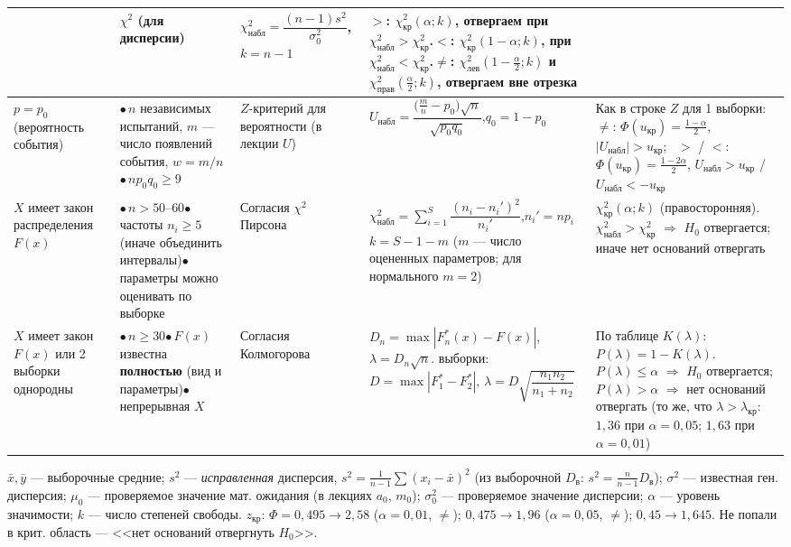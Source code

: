 \documentclass[a4paper,landscape,10pt]{extarticle}
\newcommand{\kr}{\text{кр}}\newcommand{\nab}{\text{набл}}
\newcommand{\bl}{$\bullet$\,}
\begin{document}
\begin{tabular}{|P{2.3cm}|P{4.6cm}|P{2.2cm}|P{7.1cm}|P{9.2cm}|}
& $\chi^2$ (для дисперсии)
& $\chi^2_\nab=\dfrac{(n-1)s^2}{\sigma_0^2}$,\quad $k=n-1$
& $>$: $\chi^2_\kr(\alpha;k)$, отвергаем при $\chi^2_\nab>\chi^2_\kr$.\quad $<$: $\chi^2_\kr(1-\alpha;k)$, при $\chi^2_\nab<\chi^2_\kr$.\newline $\ne$: $\chi^2_{\text{лев}}(1-\frac\alpha2;k)$ и $\chi^2_{\text{прав}}(\frac\alpha2;k)$, отвергаем \textbf{вне} отрезка \\\hline
$p=p_0$ (вероятность события)
&\newline\bl $n$ независимых испытаний, $m$ --- число появлений события, $w=m/n$\newline\bl $np_0q_0\ge9$
& $Z$-критерий для вероятности (в лекции $U$)
& $U_\nab=\dfrac{\bigl(\frac mn-p_0\bigr)\sqrt n}{\sqrt{p_0q_0}}$,\quad $q_0=1-p_0$
& Как в строке $Z$ для 1 выборки: $\ne$: $\Phi(u_\kr)=\frac{1-\alpha}{2}$, $|U_\nab|>u_\kr$; \ $>$ / $<$: $\Phi(u_\kr)=\frac{1-2\alpha}{2}$, $U_\nab>u_\kr$ / $U_\nab<-u_\kr$ \\\hline
$X$ имеет закон распределения $F(x)$
&\newline\bl $n>50$--$60$\newline\bl частоты $n_i\ge5$ (иначе объединить интервалы)\newline\bl параметры можно оценивать по выборке
& Согласия $\chi^2$ Пирсона
& $\chi^2_\nab=\sum\limits_{i=1}^{S}\dfrac{(n_i-n_i')^2}{n_i'}$,\quad $n_i'=np_i$\newline $k=S-1-m$ ($m$ --- число оцененных параметров; для нормального $m=2$)
& $\chi^2_\kr(\alpha;k)$ (правосторонняя).\newline $\chi^2_\nab>\chi^2_\kr$ $\Rightarrow$ $H_0$ отвергается; иначе нет оснований отвергать \\\hline
$X$ имеет закон $F(x)$ или 2 выборки однородны
&\newline\bl $n\ge30$\newline\bl $F(x)$ известна \textbf{полностью} (вид и параметры)\newline\bl непрерывная $X$
& Согласия Колмогорова
& $D_n=\max|F_n^*(x)-F(x)|$, $\lambda=D_n\sqrt n$. выборки: $D=\max|F_1^*-F_2^*|$, $\lambda=D\sqrt{\dfrac{n_1n_2}{n_1+n_2}}$
& По таблице $K(\lambda)$: $P(\lambda)=1-K(\lambda)$. \ $P(\lambda)\le\alpha$ $\Rightarrow$ $H_0$ отвергается; $P(\lambda)>\alpha$ $\Rightarrow$ нет оснований отвергать (то же, что $\lambda>\lambda_\kr$: $1{,}36$ при $\alpha=0{,}05$; $1{,}63$ при $\alpha=0{,}01$) \\\hline
\end{tabular}

\vspace{3pt}\footnotesize
$\bar x,\bar y$ --- выборочные средние; $s^2$ --- \emph{исправленная} дисперсия, $s^2=\frac1{n-1}\sum(x_i-\bar x)^2$ (из выборочной $D_{\text{в}}$: $s^2=\frac n{n-1}D_{\text{в}}$); $\sigma^2$ --- известная ген. дисперсия; $\mu_0$ --- проверяемое значение мат. ожидания (в лекциях $a_0$, $m_0$); $\sigma_0^2$ --- проверяемое значение дисперсии; $\alpha$ --- уровень значимости; $k$ --- число степеней свободы. \;
$z_\kr$: $\Phi=0{,}495\to2{,}58$ ($\alpha=0{,}01$, $\ne$); $0{,}475\to1{,}96$ ($\alpha=0{,}05$, $\ne$); $0{,}45\to1{,}645$. \; Не попали в крит. область --- <<нет оснований отвергнуть $H_0$>>.
\end{document}
